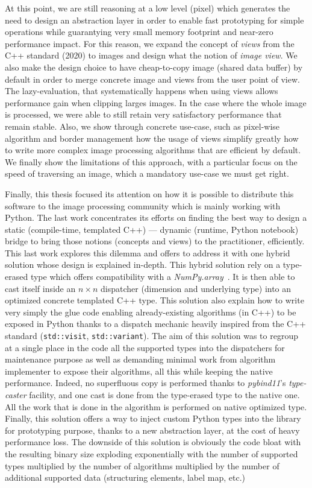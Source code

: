 At this point, we are still reasoning at a low level (pixel) which generates the need to design an abstraction layer in
order to enable fast prototyping for simple operations while guarantying very small memory footprint and near-zero
performance impact. For this reason, we expand the concept of \emph{views} from the C++ standard (2020) to images and
design what the notion of \emph{image view}. We also make the design choice to have cheap-to-copy image (shared data
buffer) by default in order to merge concrete image and views from the user point of view. The lazy-evaluation, that
systematically happens when using views allows performance gain when clipping larges images. In the case where the whole
image is processed, we were able to still retain very satisfactory performance that remain stable. Also, we show through
concrete use-case, such as pixel-wise algorithm and border management how the usage of views simplify greatly how to
write more complex image processing algorithms that are efficient by default. We finally show the limitations of this
approach, with a particular focus on the speed of traversing an image, which a mandatory use-case we must get right.

Finally, this thesis focused its attention on how it is possible to distribute this software to the image processing
community which is mainly working with Python. The last work concentrates its efforts on finding the best way to design
a static (compile-time, templated C++) --- dynamic (runtime, Python notebook) bridge to bring those notions (concepts
and views) to the practitioner, efficiently. This last work explores this dilemma and offers to address it with one
hybrid solution whose design is explained in-depth. This hybrid solution rely on a type-erased type which offers
compatibility with a \emph{NumPy.array}~\parencite{harris.2020.numpy}. It is then able to cast itself inside an \(n
\times n\) dispatcher (dimension and underlying type) into an optimized concrete templated C++ type. This solution also
explain how to write very simply the glue code enabling already-existing algorithms (in C++) to be exposed in Python
thanks to a dispatch mechanic heavily inspired from the C++ standard (\texttt{std::visit}, \texttt{std::variant}). The
aim of this solution was to regroup at a single place in the code all the supported types into the dispatchers for
maintenance purpose as well as demanding minimal work from algorithm implementer to expose their algorithms, all this
while keeping the native performance. Indeed, no superfluous copy is performed thanks to \emph{pybind11}'s
\emph{type-caster} facility, and one cast is done from the type-erased type to the native one. All the work that is done
in the algorithm is performed on native optimized type. Finally, this solution offers a way to inject custom Python
types into the library for prototyping purpose, thanks to a new abstraction layer, at the cost of heavy performance
loss. The downside of this solution is obviously the code bloat with the resulting binary size exploding exponentially
with the number of supported types multiplied by the number of algorithms multiplied by the number of additional
supported data (structuring elements, label map, etc.)

